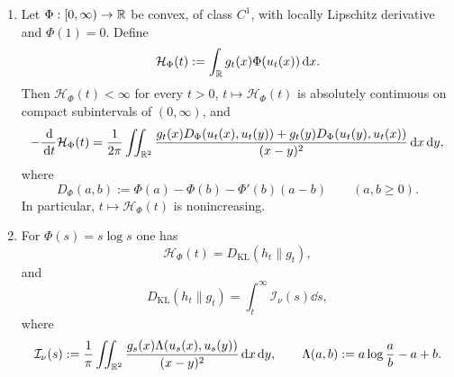 \begin{theorem}
\begin{enumerate}[label=(\roman*)]
\begin{equation}
\begin{split}
      \iint_{\RR^2}
      \frac{g_t(x)g_t(y)}{(x-y)^2}
      \\
      &\qquad\qquad\times
      \bigl(f(x)-f(y)\bigr)\bigl(\psi(x)-\psi(y)\bigr)\dd x\dd y.
      \end{split}
      \end{equation}
\item
      Let $\Phi:[0,\infty)\to\mathbb{R}$ be convex, of class $C^1$, with
      locally Lipschitz derivative and $\Phi(1)=0$.  Define
      \[
      \mathcal H_\Phi(t):=\int_{\mathbb{R}}g_t(x)\Phi(u_t(x))\,\mathrm{d} x.
      \]
      Then $\mathcal H_\Phi(t)<\infty$ for every $t>0$,
      $t\mapsto\mathcal H_\Phi(t)$ is absolutely continuous on compact
      subintervals of $(0,\infty)$, and
      \begin{equation}\label{eq:phi-entropy-dissipation}
      -\frac{\,\mathrm{d}}{\,\mathrm{d} t}\mathcal H_\Phi(t)
      =
      \frac{1}{2\pi}\iint_{\mathbb{R}^2}
      \frac{
      g_t(x)D_\Phi(u_t(x),u_t(y))
      +g_t(y)D_\Phi(u_t(y),u_t(x))}
      {(x-y)^2}\,\mathrm{d} x\,\mathrm{d} y,
      \end{equation}
      where
      \[
      D_\Phi(a,b):=\Phi(a)-\Phi(b)-\Phi'(b)(a-b)
      \qquad(a,b\ge 0).
      \]
      In particular, $t\mapsto\mathcal H_\Phi(t)$ is nonincreasing.
\item
      For $\Phi(s)=s\log s$ one has
      \[
      \mathcal H_\Phi(t)=D_{\mathrm{KL}}(h_t\|g_t),
      \]
      and
      \begin{equation}\label{eq:relative-entropy-integrated-dissipation}
      D_{\mathrm{KL}}(h_t\|g_t)
      =
      \int_t^\infty \mathcal I_\nu(s)\dd s,
      \end{equation}
      where
      \begin{equation}\label{eq:relative-entropy-dissipation-rate}
      \mathcal I_\nu(s)
      :=
      \frac{1}{\pi}\iint_{\mathbb{R}^2}
      \frac{g_s(x)\Lambda(u_s(x),u_s(y))}{(x-y)^2}\,\mathrm{d} x\,\mathrm{d} y,
      \qquad
      \Lambda(a,b):=a\log\frac{a}{b}-a+b.
      \end{equation}
\end{enumerate}
\end{theorem}


